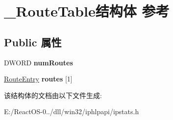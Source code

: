 \hypertarget{struct___route_table}{}\section{\+\_\+\+Route\+Table结构体 参考}
\label{struct___route_table}
\subsection*{Public 属性}
\begin{DoxyCompactItemize}
\item 
\mbox{\label{struct___route_table_a65094ec0f366f39d9492a42938f0d802}} 
D\+W\+O\+RD {\bfseries num\+Routes}
\item 
\mbox{\label{struct___route_table_a1788296e6c5cc980a063be1f710e34c1}} 
\hyperlink{struct___route_entry}{Route\+Entry} {\bfseries routes} \mbox{[}1\mbox{]}
\end{DoxyCompactItemize}


该结构体的文档由以下文件生成\+:\begin{DoxyCompactItemize}
\item 
E\+:/\+React\+O\+S-\/0../dll/win32/iphlpapi/ipstats.\+h\end{DoxyCompactItemize}
